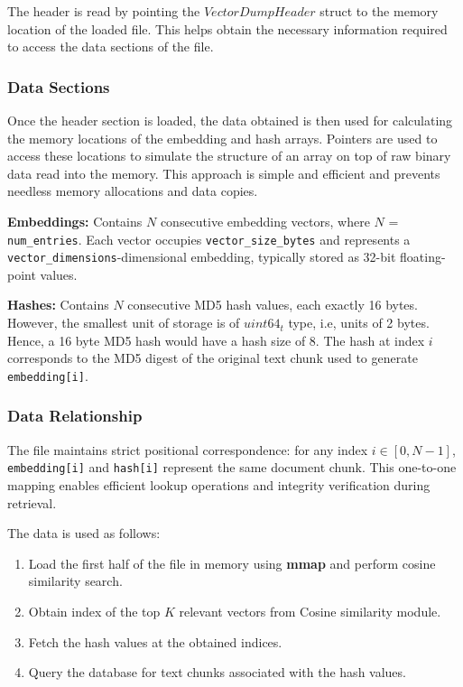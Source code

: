 The header is read by pointing the $VectorDumpHeader$ struct to the memory location of the loaded file. This helps obtain the  necessary information required to access the data sections of the file.

\subsubsection{Data Sections}
\label{subsec:Vectordump_DataSections}
Once the header section is loaded, the data obtained is then used for calculating the memory locations of the embedding and hash arrays.
Pointers are used to access these locations to simulate the structure of an array on top of raw binary data read into the memory. This approach is simple and efficient and prevents needless memory allocations and data copies.

\textbf{Embeddings:} Contains $N$ consecutive embedding vectors, where $N$ = \texttt{num\_entries}. Each vector occupies \texttt{vector\_size\_bytes} and represents a \texttt{vector\_dimensions}-dimensional embedding, typically stored as 32-bit floating-point values.

\textbf{Hashes:} Contains $N$ consecutive MD5 hash values, each exactly 16 bytes. However, the smallest unit of storage is of $uint64_t$ type, i.e, units of 2 bytes. Hence, a 16 byte MD5 hash would have a hash size of 8. The hash at index $i$ corresponds to the MD5 digest of the original text chunk used to generate \texttt{embedding[i]}.


\subsubsection{Data Relationship}
\label{subsec:Vectordump_DataRelationship}

The file maintains strict positional correspondence: for any index $i \in [0, N-1]$, \texttt{embedding[i]} and \texttt{hash[i]} represent the same document chunk. This one-to-one mapping enables efficient lookup operations and integrity verification during retrieval.

The data is used as follows:
\begin{enumerate}[label=\arabic*.]
\item Load the first half of the file in memory using \textbf{mmap} and perform cosine similarity search.
    \item Obtain index of the top $K$ relevant vectors from Cosine similarity module.
    \item Fetch the hash values at the obtained indices.
    \item Query the database for text chunks associated with the hash values.
\end{enumerate}
    

